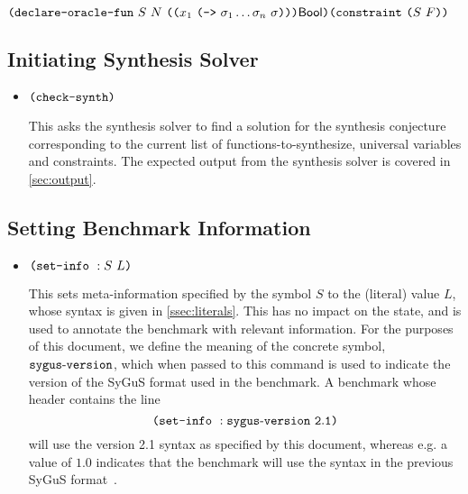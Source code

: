 \documentclass[english,a4paper,10pt]{article}
\begin{document}
\begin{itemize}
$
\paren{\oracledeckwd\mbox{ }S\mbox{ }N\mbox{ }\paren{\paren{
x_1\mbox{ }
\paren{
\funsortkwd \mbox{ } \sigma_1 \ldots \sigma_n\mbox{ }\sigma }}}
\sbool}\\
%
\paren{\constraintkwd \mbox{ } \paren{S \mbox{ } F}}
$






\end{itemize}	


\subsection{Initiating Synthesis Solver}

\begin{itemize}
\item $\texttt{(}\texttt{check-synth}\texttt{)}$

This asks the synthesis solver to find a solution for the synthesis conjecture
corresponding to the current list of functions-to-synthesize,
universal variables and constraints.
The expected output
from the synthesis solver is covered in \cref{sec:output}.
\end{itemize}

\subsection{Setting Benchmark Information}

\begin{itemize}
\item $\texttt{(}\texttt{set-info}\mbox{ }:S\mbox{ }L\texttt{)}$

This sets meta-information specified by the symbol $S$
to the (literal) value $L$, whose syntax is given in \cref{ssec:literals}.
This has no impact on the state, and is used to annotate the
benchmark with relevant information.
For the purposes of this document, we define the meaning of
the concrete symbol, ${\tt sygus\mbox{-}version}$,
which when passed to this command is used to indicate the version of the SyGuS
format used in the benchmark.
A benchmark whose header contains the line
\[
\texttt{(}\texttt{set-info}\mbox{ }:{\tt sygus\mbox{-}version\mbox{ }2.1}\texttt{)}
\]
will use the version 2.1 syntax as specified by this document,
whereas e.g. a value of $1.0$ indicates that the benchmark will use the
syntax in the previous SyGuS format~\cite{sygusFormat,sygusSyntax2015,sygusSyntax2016}.
\end{itemize}
\end{document}
